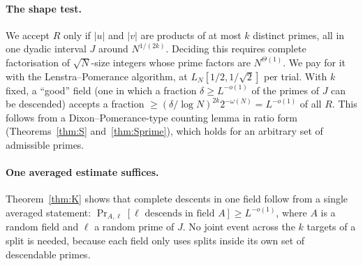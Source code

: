 \documentclass[11pt]{amsart}
\theoremstyle{definition}
\newcommand{\Prob}{\Pr}
\begin{document}
\paragraph{The shape test.} We accept $R$ only if $|u|$ and $|v|$ are products of at most $k$ distinct
primes, all in one dyadic interval $J$ around $N^{1/(2k)}$. Deciding this requires complete
factorisation of $\sqrt N$-size integers whose prime factors are $N^{\Theta(1)}$. We pay for it with the
Lenstra--Pomerance algorithm, at $L_N[1/2,1/\sqrt2]$ per trial. With $k$ fixed, a ``good'' field (one in
which a fraction $\delta\ge L^{-o(1)}$ of the primes of $J$ can be descended) accepts a fraction
$\ge(\delta/\log N)^{2k}2^{-\omega(N)}=L^{-o(1)}$ of all $R$. This follows from a
Dixon--Pomerance-type counting lemma in ratio form (Theorems~\ref{thm:S} and~\ref{thm:Sprime}), which
holds for an arbitrary set of admissible primes.

\paragraph{One averaged estimate suffices.} Theorem~\ref{thm:K} shows that complete descents in one field
follow from a single averaged statement: $\Prob_{A,\ell}[\ell\text{ descends in field }A]\ge L^{-o(1)}$,
where $A$ is a random field and $\ell$ a random prime of $J$. No joint event across the $k$ targets of a split is
needed, because each field only uses splits inside its own set of descendable primes.
\end{document}
